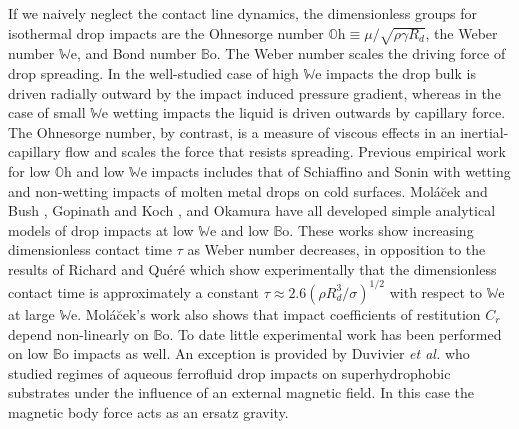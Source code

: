 \documentclass[12pt,a4paper,oneside]{book}
\begin{document}
If we naively neglect the contact line dynamics, the dimensionless groups for isothermal drop impacts are the Ohnesorge number $\mathbb{O}\mbox{h} \equiv \mu/\sqrt{\rho \gamma R_d}$, the Weber number $\mathbb{W}\mbox{e}$, and Bond number $\mathbb{B}\mbox{o}$. The Weber number scales the driving force of drop spreading. In the well-studied case of high $\mathbb{W}\mbox{e}$ impacts the drop bulk is driven radially outward by the impact induced pressure gradient, whereas in the case of small $\mathbb{W}\mbox{e}$ wetting impacts the liquid is driven outwards by capillary force. The Ohnesorge number, by contrast, is a measure of viscous effects in an inertial-capillary flow and scales the force that resists spreading. Previous empirical work for low $\mathbb{O}\mbox{h}$ and low $\mathbb{W}\mbox{e}$ impacts includes that of Schiaffino and Sonin \cite{schiaffino_molten_1997} with wetting and non-wetting impacts of molten metal drops on cold surfaces. Mol\'{a}\u{c}ek and Bush \cite{molacek_quasi-static_2012}, Gopinath and Koch \cite{gopinath_collision_2002}, and Okamura \cite{okumura_water_2003} have all developed simple analytical models of drop impacts at low $\mathbb{W}\mbox{e}$ and low $\mathbb{B}\mbox{o}$. These works show increasing dimensionless contact time $\tau$ as Weber number decreases, in opposition to the results of Richard and Qu\'{e}r\'{e} \cite{richard_surface_2002} which show experimentally that the dimensionless contact time is approximately a constant $\tau \approx 2.6(\rho R^3_d/\sigma)^{1/2}$ with respect to $\mathbb{W}\mbox{e}$ at large $\mathbb{W}\mbox{e}$. Mol\'{a}\u{c}ek's work also shows that impact coefficients of restitution $C_r$ depend non-linearly on $\mathbb{B}\mbox{o}$. To date little experimental work has been performed on low $\mathbb{B}\mbox{o}$ impacts as well. An exception is provided by Duvivier \emph{et al.} \cite{duvivier_drop_2012} who studied regimes of aqueous ferrofluid drop impacts on superhydrophobic substrates under the influence of an external magnetic field. In this case the magnetic body force acts as an ersatz gravity.
\end{document}
